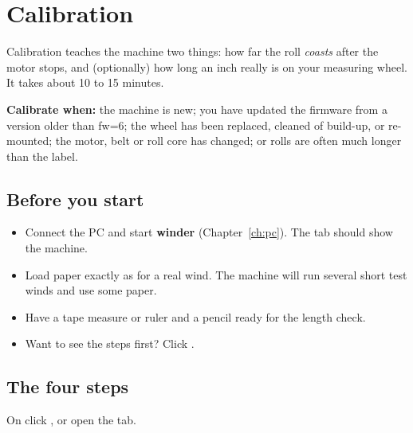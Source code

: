 \chapter{Calibration}\label{ch:calibration}

Calibration teaches the machine two things: how far the roll \emph{coasts}
after the motor stops, and (optionally) how long an inch really is on your
measuring wheel. It takes about 10 to 15 minutes.

\textbf{Calibrate when:} the machine is new; you have updated the firmware
from a version older than fw=6; the wheel has been replaced, cleaned of
build-up, or re-mounted; the motor, belt or roll core has changed; or rolls
are often much longer than the label.

\section{Before you start}
\begin{itemize}
  \item Connect the PC and start \textbf{winder} (Chapter~\ref{ch:pc}). The
         tab should show the machine.
  \item Load paper exactly as for a real wind. The machine will run several
        short test winds and use some paper.
  \item Have a tape measure or ruler and a pencil ready for the length check.
  \item Want to see the steps first? Click .
\end{itemize}

\section{The four steps}
On  click , or open the  tab.

